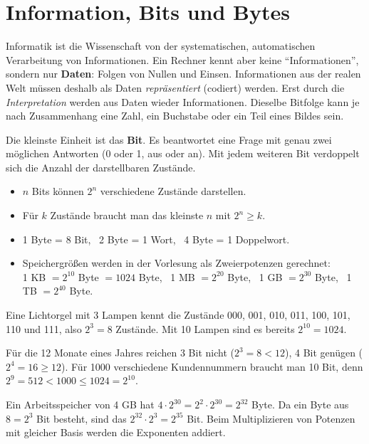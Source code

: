 \section{Information, Bits und Bytes}
\worum
Informatik ist die Wissenschaft von der systematischen, automatischen Verarbeitung von Informationen. Ein Rechner kennt aber keine \enquote{Informationen}, sondern nur \textbf{Daten}: Folgen von Nullen und Einsen. Informationen aus der realen Welt müssen deshalb als Daten \emph{repräsentiert} (codiert) werden. Erst durch die \emph{Interpretation} werden aus Daten wieder Informationen. Dieselbe Bitfolge kann je nach Zusammenhang eine Zahl, ein Buchstabe oder ein Teil eines Bildes sein.

Die kleinste Einheit ist das \textbf{Bit}. Es beantwortet eine Frage mit genau zwei möglichen Antworten (0 oder 1, aus oder an). Mit jedem weiteren Bit verdoppelt sich die Anzahl der darstellbaren Zustände.

\begin{merke}
\begin{itemize}[itemsep=0.1em]
\item $n$ Bits können $2^n$ verschiedene Zustände darstellen.
\item Für $k$ Zustände braucht man das kleinste $n$ mit $2^n \geq k$.
\item 1 Byte = 8 Bit, \ 2 Byte = 1 Wort, \ 4 Byte = 1 Doppelwort.
\item Speichergrößen werden in der Vorlesung als Zweierpotenzen gerechnet: \\
1 KB $= 2^{10}$ Byte $= 1024$ Byte, \ 1 MB $= 2^{20}$ Byte, \ 1 GB $= 2^{30}$ Byte, \ 1 TB $= 2^{40}$ Byte.
\end{itemize}
\end{merke}

\beispiele
{}
Eine Lichtorgel mit 3 Lampen kennt die Zustände 000, 001, 010, 011, 100, 101, 110 und 111, also $2^3 = 8$ Zustände. Mit 10 Lampen sind es bereits $2^{10} = 1024$.

Für die 12 Monate eines Jahres reichen 3 Bit nicht ($2^3 = 8 < 12$), 4 Bit genügen ($2^4 = 16 \geq 12$). Für 1000 verschiedene Kundennummern braucht man 10 Bit, denn $2^9 = 512 < 1000 \leq 1024 = 2^{10}$.

Ein Arbeitsspeicher von 4 GB hat $4 \cdot 2^{30} = 2^2 \cdot 2^{30} = 2^{32}$ Byte. Da ein Byte aus $8 = 2^3$ Bit besteht, sind das $2^{32} \cdot 2^3 = 2^{35}$ Bit. Beim Multiplizieren von Potenzen mit gleicher Basis werden die Exponenten addiert.

